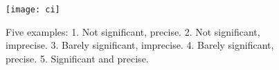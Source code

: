 \documentclass[twoside,12pt]{article}
\begin{document}
\begin{figure}
\vspace{-1in}
\begin{center}
\texttt{[image: ci]}
\end{center}
\caption{Five examples:
1. Not significant, precise.
2. Not significant, imprecise.
3. Barely significant, imprecise.
4. Barely significant, precise.
5. Significant and precise.}
\label{fig::testversusci}
\end{figure}
\end{document}
